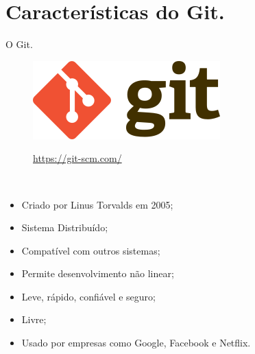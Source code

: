 \documentclass[brazil,aspectratio=169]{beamer}
\begin{document}
\section{Características do Git.}
\begin{frame}{O Git.}

  \begin{figure}
    \centering
    \includegraphics[scale=0.35]{imagens/git-logo}
    
    \url{https://git-scm.com/}
  \end{figure}

  \begin{block}{\ }
    \begin{itemize}
      \item Criado por Linus Torvalds em 2005;
      \item Sistema Distribuído;
      \item Compatível com outros sistemas;
      \item Permite desenvolvimento não linear;
      \item Leve, rápido, confiável e seguro;
      \item Livre;
      \item Usado por empresas como Google, Facebook e Netflix.
    \end{itemize}
  \end{block}

\end{frame}
\end{document}
